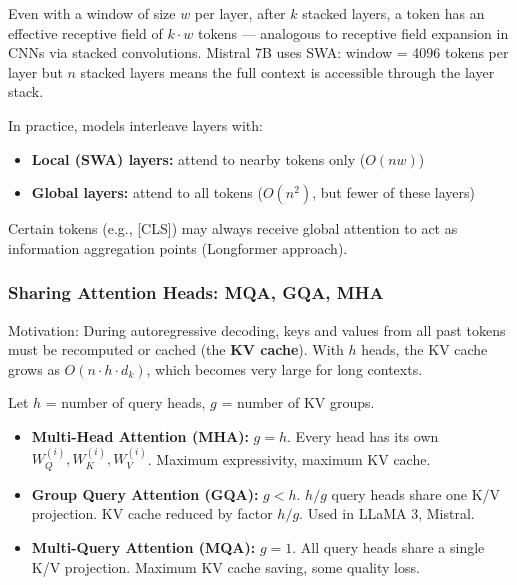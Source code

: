 \documentclass[11pt, a4paper]{article}
\begin{document}
\begin{exbox}
Even with a window of size $w$ per layer, after $k$ stacked layers, a token has an effective receptive field of $k \cdot w$ tokens --- analogous to receptive field expansion in CNNs via stacked convolutions. Mistral 7B uses SWA: window = 4096 tokens per layer but $n$ stacked layers means the full context is accessible through the layer stack.
\end{exbox}

\begin{notebox}
In practice, models interleave layers with:
\begin{itemize}[leftmargin=1.5em]
  \item \textbf{Local (SWA) layers:} attend to nearby tokens only ($O(nw)$)
  \item \textbf{Global layers:} attend to all tokens ($O(n^2)$, but fewer of these layers)
\end{itemize}
Certain tokens (e.g., [CLS]) may always receive global attention to act as information aggregation points (Longformer approach).
\end{notebox}

\subsubsection{Sharing Attention Heads: MQA, GQA, MHA}

Motivation: During autoregressive decoding, keys and values from all past tokens must be recomputed or cached (the \textbf{KV cache}). With $h$ heads, the KV cache grows as $O(n \cdot h \cdot d_k)$, which becomes very large for long contexts.

\begin{defbox}
Let $h$ = number of query heads, $g$ = number of KV groups.

\begin{itemize}[leftmargin=1.5em]
  \item \textbf{Multi-Head Attention (MHA):} $g = h$. Every head has its own $W_Q^{(i)}, W_K^{(i)}, W_V^{(i)}$. Maximum expressivity, maximum KV cache.
  \item \textbf{Group Query Attention (GQA):} $g < h$. $h/g$ query heads share one K/V projection. KV cache reduced by factor $h/g$. Used in LLaMA 3, Mistral.
  \item \textbf{Multi-Query Attention (MQA):} $g = 1$. All query heads share a single K/V projection. Maximum KV cache saving, some quality loss.
\end{itemize}
\end{defbox}
\end{document}

